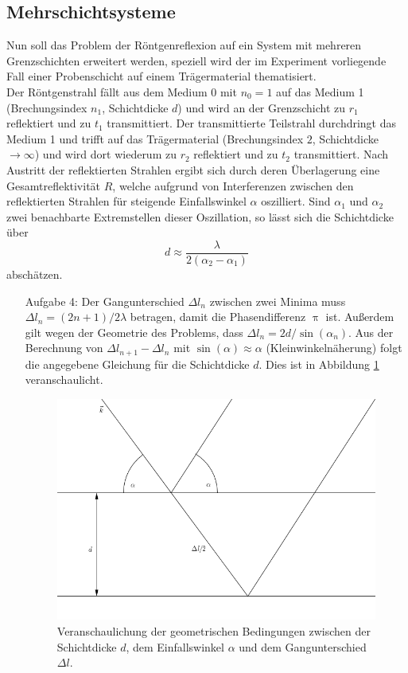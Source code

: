 \subsection{Mehrschichtsysteme}
Nun soll das Problem der Röntgenreflexion auf ein System mit mehreren 
Grenzschichten erweitert werden, speziell wird der im Experiment vorliegende 
Fall einer Probenschicht auf einem Trägermaterial thematisiert.\\
Der Röntgenstrahl fällt aus dem Medium 0 mit $n_0=1$ auf das Medium 
1 (Brechungsindex $n_1$, Schichtdicke $d$) und wird an der Grenzschicht zu $r_1$ 
reflektiert und zu $t_1$ 
transmittiert. Der transmittierte Teilstrahl durchdringt das Medium 1 und trifft 
auf das Trägermaterial (Brechungsindex $2$, Schichtdicke $\to \infty$) und wird 
dort wiederum zu $r_2$ reflektiert und zu $t_2$ transmittiert. Nach Austritt der 
reflektierten Strahlen ergibt sich durch deren Überlagerung eine 
Gesamtreflektivität $R$, welche aufgrund von Interferenzen zwischen den 
reflektierten Strahlen für steigende Einfallswinkel $\alpha$ oszilliert. Sind 
$\alpha_1$ und $\alpha_2$ zwei benachbarte Extremstellen dieser Oszillation, so 
lässt sich die Schichtdicke über
\begin{equation}
d \approx \frac{\lambda}{2(\alpha_2 -\alpha_1)}
\end{equation}
abschätzen.
\begin{itemize}
\item[Aufgabe 4:]
Der Gangunterschied $\Delta l_n$ zwischen zwei Minima muss $\Delta l_n=
(2n+1)/2 \lambda$ betragen, damit die Phasendifferenz $\uppi$ ist. Außerdem 
gilt wegen der Geometrie des Problems, dass $\Delta l_n = 2 d/\sin(\alpha_n)$. 
Aus der Berechnung von $\Delta l_{n+1}- \Delta l_n$ mit $\sin(\alpha)\approx 
\alpha$ (Kleinwinkelnäherung) folgt die angegebene Gleichung für die 
Schichtdicke $d$. Dies ist in Abbildung \ref{fig:Bild} veranschaulicht.
\begin{figure}[h]
\centering
\includegraphics[scale=0.4]{../skript/Bild.png}
\caption{Veranschaulichung der geometrischen Bedingungen zwischen der 
Schichtdicke $d$, dem Einfallswinkel $\alpha$ und dem Gangunterschied $\Delta 
l$.}
\label{fig:Bild}
\end{figure}
\end{itemize}
